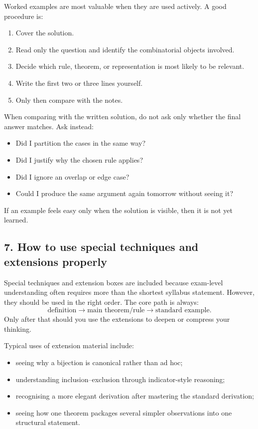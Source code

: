 \documentclass[12pt]{article}
\begin{document}
Worked examples are most valuable when they are used actively. A good procedure is:
\begin{enumerate}[leftmargin=*]
    \item Cover the solution.
    \item Read only the question and identify the combinatorial objects involved.
    \item Decide which rule, theorem, or representation is most likely to be relevant.
    \item Write the first two or three lines yourself.
    \item Only then compare with the notes.
\end{enumerate}

When comparing with the written solution, do not ask only whether the final answer matches. Ask instead:
\begin{itemize}[leftmargin=*]
    \item Did I partition the cases in the same way?
    \item Did I justify why the chosen rule applies?
    \item Did I ignore an overlap or edge case?
    \item Could I produce the same argument again tomorrow without seeing it?
\end{itemize}

If an example feels easy only when the solution is visible, then it is not yet learned.

\subsection*{7. How to use special techniques and extensions properly}

Special techniques and extension boxes are included because exam-level understanding often requires more than the shortest syllabus statement. However, they should be used in the right order. The core path is always:
\[
\text{definition} \longrightarrow \text{main theorem/rule} \longrightarrow \text{standard example}.
\]
Only after that should you use the extensions to deepen or compress your thinking.

Typical uses of extension material include:
\begin{itemize}[leftmargin=*]
    \item seeing why a bijection is canonical rather than ad hoc;
    \item understanding inclusion--exclusion through indicator-style reasoning;
    \item recognising a more elegant derivation after mastering the standard derivation;
    \item seeing how one theorem packages several simpler observations into one structural statement.
\end{itemize}
\end{document}

